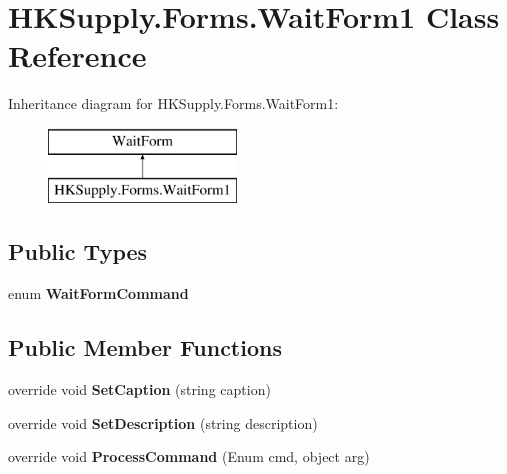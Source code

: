 \hypertarget{class_h_k_supply_1_1_forms_1_1_wait_form1}{}\section{H\+K\+Supply.\+Forms.\+Wait\+Form1 Class Reference}
\label{class_h_k_supply_1_1_forms_1_1_wait_form1}
Inheritance diagram for H\+K\+Supply.\+Forms.\+Wait\+Form1\+:\begin{figure}[H]
\begin{center}
\leavevmode
\includegraphics[height=2.000000cm]{class_h_k_supply_1_1_forms_1_1_wait_form1}
\end{center}
\end{figure}
\subsection*{Public Types}
\begin{DoxyCompactItemize}
\item 
\mbox{\label{class_h_k_supply_1_1_forms_1_1_wait_form1_a5eac150298fb445e34587c3fc2e63669}} 
enum {\bfseries Wait\+Form\+Command} 
\end{DoxyCompactItemize}
\subsection*{Public Member Functions}
\begin{DoxyCompactItemize}
\item 
\mbox{\label{class_h_k_supply_1_1_forms_1_1_wait_form1_a1efd8f41355f398a5b28c83ca3401f66}} 
override void {\bfseries Set\+Caption} (string caption)
\item 
\mbox{\label{class_h_k_supply_1_1_forms_1_1_wait_form1_afde999574fad6f39b6a43b659ba7877e}} 
override void {\bfseries Set\+Description} (string description)
\item 
\mbox{\label{class_h_k_supply_1_1_forms_1_1_wait_form1_a5cb2f7511f206451e9c42c5e69636758}} 
override void {\bfseries Process\+Command} (Enum cmd, object arg)
\end{DoxyCompactItemize}

